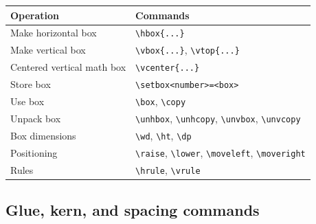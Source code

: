 \documentclass[11pt]{article}
\begin{document}
\begin{longtable}[]{@{}ll@{}}
\toprule\noalign{}
Operation & Commands \\
\midrule\noalign{}
\endhead
\bottomrule\noalign{}
\endlastfoot
Make horizontal box & \texttt{\textbackslash{}hbox\{...\}} \\
Make vertical box & \texttt{\textbackslash{}vbox\{...\}}, \texttt{\textbackslash{}vtop\{...\}} \\
Centered vertical math box & \texttt{\textbackslash{}vcenter\{...\}} \\
Store box & \texttt{\textbackslash{}setbox<number>=<box>} \\
Use box & \texttt{\textbackslash{}box}, \texttt{\textbackslash{}copy} \\
Unpack box & \texttt{\textbackslash{}unhbox}, \texttt{\textbackslash{}unhcopy}, \texttt{\textbackslash{}unvbox}, \texttt{\textbackslash{}unvcopy} \\
Box dimensions & \texttt{\textbackslash{}wd}, \texttt{\textbackslash{}ht}, \texttt{\textbackslash{}dp} \\
Positioning & \texttt{\textbackslash{}raise}, \texttt{\textbackslash{}lower}, \texttt{\textbackslash{}moveleft}, \texttt{\textbackslash{}moveright} \\
Rules & \texttt{\textbackslash{}hrule}, \texttt{\textbackslash{}vrule} \\
\end{longtable}

\subsection{Glue, kern, and spacing commands}\label{glue-kern-and-spacing-commands}
\end{document}
